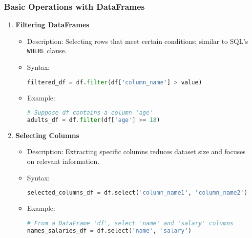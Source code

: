\documentclass[aspectratio=169]{beamer}
\begin{document}
\begin{frame}[fragile]
    \frametitle{Basic Operations with DataFrames}
    \begin{enumerate}
        \item \textbf{Filtering DataFrames}
            \begin{itemize}
                \item Description: Selecting rows that meet certain conditions; similar to SQL's \texttt{WHERE} clause.
                \item Syntax:
                \begin{lstlisting}[language=Python]
filtered_df = df.filter(df['column_name'] > value)
                \end{lstlisting}
                \item Example:
                \begin{lstlisting}[language=Python]
# Suppose df contains a column 'age'
adults_df = df.filter(df['age'] >= 18)
                \end{lstlisting}
            \end{itemize}
        \item \textbf{Selecting Columns}
            \begin{itemize}
                \item Description: Extracting specific columns reduces dataset size and focuses on relevant information.
                \item Syntax:
                \begin{lstlisting}[language=Python]
selected_columns_df = df.select('column_name1', 'column_name2')
                \end{lstlisting}
                \item Example:
                \begin{lstlisting}[language=Python]
# From a DataFrame 'df', select 'name' and 'salary' columns
names_salaries_df = df.select('name', 'salary')
                \end{lstlisting}
            \end{itemize}
    \end{enumerate}
\end{frame}
\end{document}
